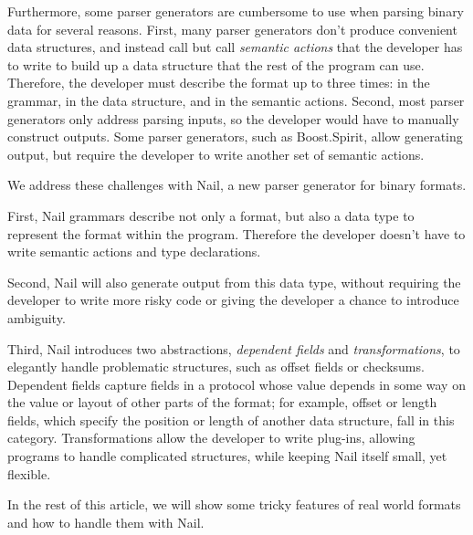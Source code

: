 Furthermore, some parser generators are cumbersome to use when parsing binary data for several
reasons. First, many parser generators don't produce convenient data structures, and instead call
but call \emph{semantic actions} that the developer has to write to build up a data structure that
the rest of the program can use. Therefore, the developer must
describe the format up to three times: in the grammar, in the data structure, and in the semantic
actions. Second, most parser generators only address parsing inputs, so the developer would have to manually
construct outputs. Some parser generators, such as 
Boost.Spirit, allow generating output, but require the developer to write another set of semantic actions.

We address these challenges with Nail, a new parser generator for binary formats.

First, Nail grammars describe not only a format, but also a data type to represent the format within the program.
Therefore the developer doesn't have to write semantic actions and type declarations.

Second, Nail will also generate output from this data type, without requiring the developer
to write more risky code or giving the developer a chance to introduce ambiguity.

Third,  Nail introduces two abstractions, \emph{dependent fields} and
\emph{transformations}, to elegantly handle problematic structures,
such as offset fields or checksums.  Dependent fields capture fields
in a protocol whose value depends in some way on the value or layout
of other parts of the format; for example, offset or length fields,
which specify the position or length of another data structure, fall
in this category.  Transformations allow the developer to write plug-ins,
allowing programs to handle complicated structures, while
keeping Nail itself small, yet flexible. 

In the rest of this article, we will show some tricky features of real world formats and how to
handle them with Nail.


